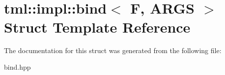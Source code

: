 \hypertarget{structtml_1_1impl_1_1bind}{\section{tml\+:\+:impl\+:\+:bind$<$ F, A\+R\+G\+S $>$ Struct Template Reference}
\label{structtml_1_1impl_1_1bind}
}


The documentation for this struct was generated from the following file\+:\begin{DoxyCompactItemize}
\item 
bind.\+hpp\end{DoxyCompactItemize}

